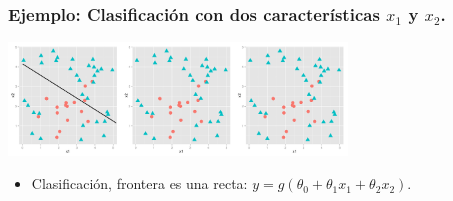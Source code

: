 \documentclass{beamer}
\begin{document}
  \begin{frame}\frametitle{Ejemplo: Clasificación con dos características $x_1$ y $x_2$.}
   \begin{overlayarea}{\textwidth}{8cm} 
 \begin{center}
   \includegraphics[height=3cm]{decisionboundaries-100.png}
 \end{center}
     \begin{itemize}
 \item Clasificación, frontera es una  recta: $y=g(\theta_0+\theta_1x_1+\theta_2x_2)$.
 \end{itemize}

   \end{overlayarea}

 \end{frame}
\end{document}
